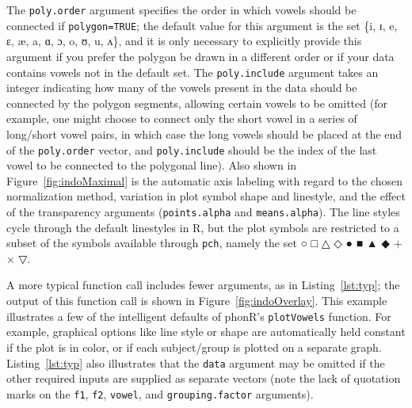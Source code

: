 \documentclass[12pt,oneside]{article}
\begin{document}
The \texttt{poly.order} argument specifies the order in which vowels should be connected if \texttt{polygon=TRUE}; the default value for this argument is the set \{i, ɪ, e, ɛ, æ, a, ɑ, ɔ, o, ʊ, u, ʌ\}, and it is only necessary to explicitly provide this argument if you prefer the polygon be drawn in a different order or if your data contains vowels not in the default set.  The \texttt{poly.include} argument takes an integer indicating how many of the vowels present in the data should be connected by the polygon segments, allowing certain vowels to be omitted (for example, one might choose to connect only the short vowel in a series of long/short vowel pairs, in which case the long vowels should be placed at the end of the \texttt{poly.order} vector, and \texttt{poly.include} should be the index of the last vowel to be connected to the polygonal line).  Also shown in Figure~\ref{fig:indoMaximal} is the automatic axis labeling with regard to the chosen normalization method, variation in plot symbol shape and linestyle, and the effect of the transparency arguments (\texttt{points.alpha} and \texttt{means.alpha}).  The line styles cycle through the default linestyles in R, but the plot symbols are restricted to a subset of the symbols available through \texttt{pch}, namely the set ○ □ △ ◇ ● ■ ▲ ◆ + × ▽. %

A more typical function call includes fewer arguments, as in Listing~\ref{lst:typ}; the output of this function call is shown in Figure~\ref{fig:indoOverlay}.  This example illustrates a few of the intelligent defaults of phonR's \texttt{plotVowels} function.  For example, graphical options like line style or shape are automatically held constant if the plot is in color, or if each subject/group is plotted on a separate graph.  Listing~\ref{lst:typ} also illustrates that the \texttt{data} argument may be omitted if the other required inputs are supplied as separate vectors (note the lack of quotation marks on the \texttt{f1}, \texttt{f2}, \texttt{vowel}, and \texttt{grouping.factor} arguments).  
\end{document}
